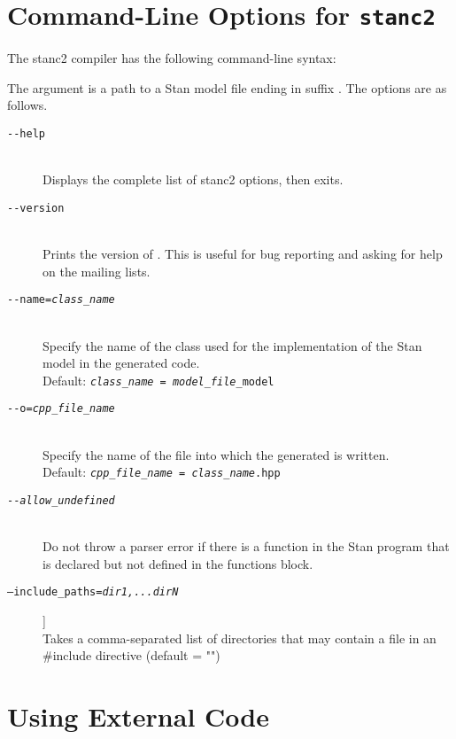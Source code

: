 \section{Command-Line Options for {\tt\bfseries stanc2}}

The stanc2 compiler has the following command-line syntax:
%
\begin{quote}
\end{quote}
%
The argument  is a path to a Stan model
file ending in suffix .  The options are as follows.
%
\begin{description}
%
\item[\tt {-}-help] 
\mbox{ } \\ 
Displays the complete list of stanc2 options, then exits.
%
\item[\tt {-}-version]
\mbox{ } \\ 
Prints the version of \stanc.  This is useful for bug reporting
and asking for help on the mailing lists.
%
\item[\tt {-}-name={\slshape class\_name}]
\mbox{ } \\ 
Specify the name of the class used for the implementation of the
Stan model in the generated \Cpp code.  
\\[2pt]
Default: {\tt {\slshape class\_name = model\_file}\_model}
%
\item[\tt {-}-o={\slshape cpp\_file\_name}]
  \mbox{ } \\ 
Specify the name of the file into which the generated \Cpp is written.
\\[2pt]
Default: {\tt {\slshape cpp\_file\_name} = {\slshape class\_name}.hpp}
%
\item[\tt {-}-{\slshape allow\_undefined}]
\mbox{ } \\ 
Do not throw a parser error if there is a function in the Stan program
that is declared but not defined in the functions block.
%
\item[\tt  --include\_paths={\slshape dir1,...dirN}]]
\mbox{ } \\ 
Takes a comma-separated list of directories that may contain a file in an \#include directive (default = "")
%
\end{description}

\section{Using External \Cpp Code}

